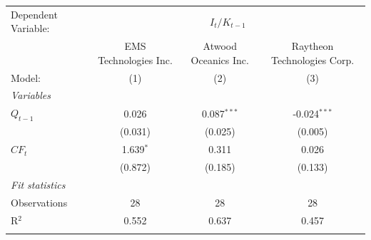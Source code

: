 \begin{tabular}{lccc}
   \tabularnewline \midrule \midrule
   Dependent Variable: & \multicolumn{3}{c}{$I_t/K_{t-1}$}\\
                & EMS Technologies Inc. & Atwood Oceanics Inc. & Raytheon Technologies Corp. \\   
   Model:       & (1)                   & (2)                  & (3)\\  
   \midrule
   \emph{Variables}\\
   $Q_{t-1}$    & 0.026                 & 0.087$^{***}$        & -0.024$^{***}$\\   
                & (0.031)               & (0.025)              & (0.005)\\   
   $CF_t$       & 1.639$^{*}$           & 0.311                & 0.026\\   
                & (0.872)               & (0.185)              & (0.133)\\   
   \midrule
   \emph{Fit statistics}\\
   Observations & 28                    & 28                   & 28\\  
   R$^2$        & 0.552                 & 0.637                & 0.457\\  
   \midrule \midrule & \tabularnewline
\end{tabular}
